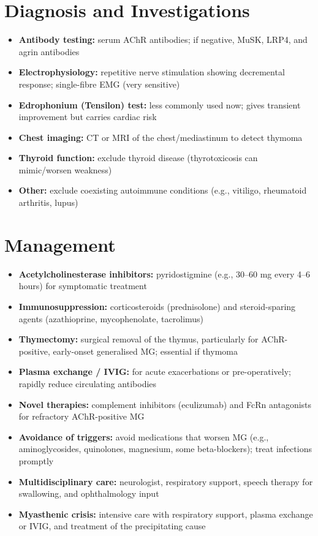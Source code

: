 \section*{Diagnosis and Investigations}
\begin{itemize}
    \item \textbf{Antibody testing:} serum AChR antibodies; if negative, MuSK, LRP4, and agrin antibodies
    \item \textbf{Electrophysiology:} repetitive nerve stimulation showing decremental response; single-fibre EMG (very sensitive)
    \item \textbf{Edrophonium (Tensilon) test:} less commonly used now; gives transient improvement but carries cardiac risk
    \item \textbf{Chest imaging:} CT or MRI of the chest/mediastinum to detect thymoma
    \item \textbf{Thyroid function:} exclude thyroid disease (thyrotoxicosis can mimic/worsen weakness)
    \item \textbf{Other:} exclude coexisting autoimmune conditions (e.g., vitiligo, rheumatoid arthritis, lupus)
\end{itemize}

\section*{Management}
\begin{itemize}
    \item \textbf{Acetylcholinesterase inhibitors:} pyridostigmine (e.g., 30--60 mg every 4--6 hours) for symptomatic treatment
    \item \textbf{Immunosuppression:} corticosteroids (prednisolone) and steroid-sparing agents (azathioprine, mycophenolate, tacrolimus)
    \item \textbf{Thymectomy:} surgical removal of the thymus, particularly for AChR-positive, early-onset generalised MG; essential if thymoma
    \item \textbf{Plasma exchange / IVIG:} for acute exacerbations or pre-operatively; rapidly reduce circulating antibodies
    \item \textbf{Novel therapies:} complement inhibitors (eculizumab) and FcRn antagonists for refractory AChR-positive MG
    \item \textbf{Avoidance of triggers:} avoid medications that worsen MG (e.g., aminoglycosides, quinolones, magnesium, some beta-blockers); treat infections promptly
    \item \textbf{Multidisciplinary care:} neurologist, respiratory support, speech therapy for swallowing, and ophthalmology input
    \item \textbf{Myasthenic crisis:} intensive care with respiratory support, plasma exchange or IVIG, and treatment of the precipitating cause
\end{itemize}

